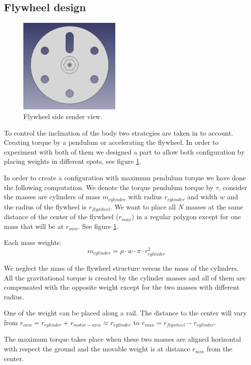 \subsection{Flywheel design} \label{sec: flywheel design}
\begin{figure}
	\centering
	\includegraphics[width=5cm]{img/fly_wheel_side.png}
	\caption{Flywheel side render view.}
	\label{fig:Fly wheel side render view}
\end{figure}

To control the inclination of the body two strategies are taken in to account.
Creating torque by a pendulum or accelerating the flywheel.
In order to experiment with both of them we designed a part to allow
both configuration by placing weights in different spots, see figure
\ref{fig:Fly wheel side render view}.

In order to create a configuration with maximum pendulum torque
we have done the following computation. We denote the torque pendulum
torque by $\tau$, consider the masses are cylinders of mass $m_{cylinder}$
with radius $r_{cylinder}$ and width $w$ and the radius of the flywheel is $r_{flywheel}$.
We want to place all $N$ masses at the same distance of the center of the flywheel ($r_{max}$) in
a regular polygon except for one mass that will be at $r_{min}$. See figure \ref{fig:Fly wheel side render view}.

Each mass weights:
\[ m_{cylinder} = \rho \cdot w \cdot \pi \cdot r_{cylinder}^2 \]

We neglect the mass of the flywheel structure versus the mass of the cylinders. All
the gravitational torque is created by the cylinder masses and all of them are compensated
with the opposite weight except for the two masses with different radius.

One of the weight can be placed along a rail. The distance to the center will
vary from $r_{min} = r_{cylinder} + r_{motor-axis} \approx r_{cylinder} $ to $r_{max} = r_{flywheel} - r_{cylinder}$.

The maximum torque takes place when these two masses are aligned horizontal with respect the ground and the movable weight is at distance $r_{min}$ from the center.

